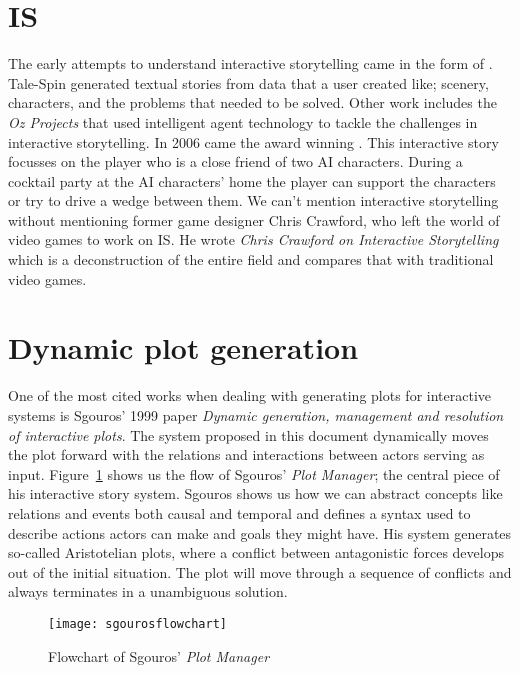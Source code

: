 \section{IS}
The early attempts to understand interactive storytelling came in the form of \cite{Meehan77talespin}. Tale-Spin generated textual stories from data that a user created like; scenery, characters, and the problems that needed to be solved. Other work includes the \textit{Oz Projects}\cite{Mateas97anozcentric} that used intelligent agent technology to tackle the challenges in interactive storytelling. In 2006 came the award winning \citep{Mateas03facade:an}. This interactive story focusses on the player who is a close friend of two AI characters. During a cocktail party at the AI characters' home the player can support the characters or try to drive a wedge between them. We can't mention interactive storytelling without mentioning former game designer Chris Crawford, who left the world of video games to work on IS. He wrote \textit{Chris Crawford on Interactive Storytelling}\cite{crawford2012chris} which is a deconstruction of the entire field and compares that with traditional video games. 


\section{Dynamic plot generation}
One of the most cited works when dealing with generating plots for interactive systems is Sgouros' 1999 paper \textit{Dynamic generation, management and resolution of interactive plots}\cite{Sgouros199929}. The system proposed in this document dynamically moves the plot forward with the relations and interactions between actors serving as input. Figure~\ref{fig:sgouros_flowchart} shows us the flow of Sgouros' \textit{Plot Manager}; the central piece of his interactive story system. Sgouros shows us how we can abstract concepts like relations and events both causal and temporal and defines a syntax used to describe actions actors can make and goals they might have. His system generates so-called Aristotelian plots, where a conflict between antagonistic forces develops out of the initial situation. The plot will move through a sequence of conflicts and always terminates in a unambiguous solution. 

\begin{figure}
	\texttt{[image: sgourosflowchart]}
	\caption{Flowchart of Sgouros' \textit{Plot Manager}}
	\label{fig:sgouros_flowchart}
\end{figure}

